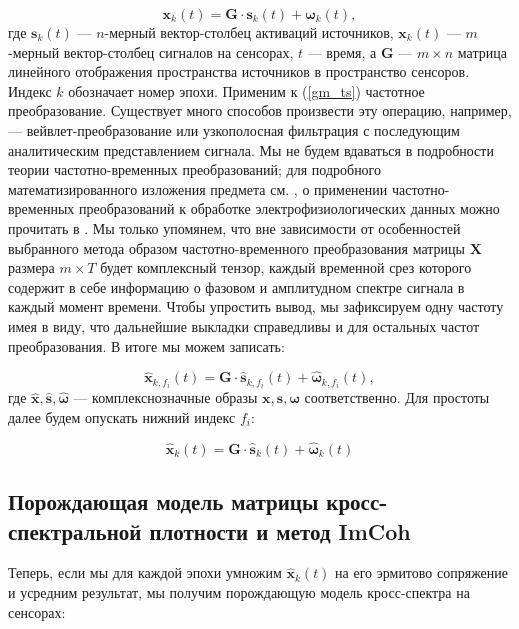 \begin{equation}
    \mathbf{x}_k(t) = \mathbf{G} \cdot \mathbf{s}_k(t) + \mathbf{\omega}_k(t),
    \label{gm_ts}
\end{equation}
где $\mathbf{s}_k(t)$ --- $n$-мерный вектор-столбец активаций источников,
$\mathbf{x}_k(t)$ --- $m$-мерный вектор-столбец сигналов на сенсорах,
$t$ --- время, а $\mathbf{G}$ --- $m \times n$ матрица линейного отображения
пространства источников в пространство сенсоров.
Индекс $k$ обозначает номер эпохи.
Применим к (\ref{gm_ts}) частотное преобразование. Существует много способов произвести
эту операцию, например, --- вейвлет-преобразование или узкополосная фильтрация
с последующим аналитическим представлением сигнала.
Мы не будем вдаваться в подробности теории частотно-временных преобразований;
для подробного математизированного изложения предмета см.
\cite{Oppenheim1998}, о  применении  частотно-временных преобразований к обработке
электрофизиологических данных можно прочитать в \cite{Freeman}.
Мы только упомянем, что вне зависимости от особенностей выбранного
метода образом частотно-временного преобразования матрицы $\mathbf{X}$ размера $m \times T$
будет комплексный тензор, каждый временной срез которого содержит в себе информацию
о фазовом и амплитудном спектре сигнала в каждый момент времени.
Чтобы упростить вывод, мы зафиксируем одну частоту имея в виду,
что дальнейшие выкладки справедливы и для остальных частот преобразования. В итоге мы можем записать:

\begin{equation}
    \hat{\mathbf{x}}_{k,f_i}(t) = \mathbf{G} \cdot \hat{\mathbf{s}}_{k,f_i}(t) + \hat{\mathbf{\omega}}_{k,f_i}(t),
    \label{gm_timefreq}
\end{equation}
где $\hat{\mathbf{x}}, \hat{\mathbf{s}}, \hat{\mathbf{\omega}}$ --- комплекснозначные образы $\mathbf{x}, \mathbf{s}, \mathbf{\omega}$ соответственно.
Для простоты далее будем опускать нижний индекс $f_i$:

\begin{equation}
    \hat{\mathbf{x}}_k(t) = \mathbf{G} \cdot \hat{\mathbf{s}}_k(t) + \hat{\mathbf{\omega}}_k(t)
    \label{gm_timefreq_no_fi}
\end{equation}

\subsection{Порождающая модель матрицы кросс-спектральной плотности и метод ImCoh}
\label{sec:imcoh}
Теперь, если мы для каждой эпохи умножим $\hat{\mathbf{x}}_k(t)$ на его эрмитово сопряжение и усредним результат,
мы получим порождающую модель кросс-спектра на сенсорах:

